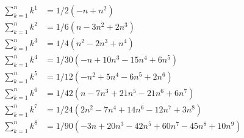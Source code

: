 \begin{equation*}
    \begin{split}
        \sum_{k=1}^{n} k^{1} &= 1/2 (-n + n^2) \\
        \sum_{k=1}^{n} k^{2} &= 1/6 (n - 3 n^2 + 2 n^3) \\
        \sum_{k=1}^{n} k^{3} &= 1/4 (n^2 - 2 n^3 + n^4) \\
        \sum_{k=1}^{n} k^{4} &= 1/30 (-n + 10 n^3 - 15 n^4 + 6 n^5) \\
        \sum_{k=1}^{n} k^{5} &= 1/12 (-n^2 + 5 n^4 - 6 n^5 + 2 n^6) \\
        \sum_{k=1}^{n} k^{6} &= 1/42 (n - 7 n^3 + 21 n^5 - 21 n^6 + 6 n^7) \\
        \sum_{k=1}^{n} k^{7} &= 1/24 (2 n^2 - 7 n^4 + 14 n^6 - 12 n^7 + 3 n^8) \\
        \sum_{k=1}^{n} k^{8} &= 1/90 (-3 n + 20 n^3 - 42 n^5 + 60 n^7 - 45 n^8 + 10 n^9) \\
    \end{split}
\end{equation*}